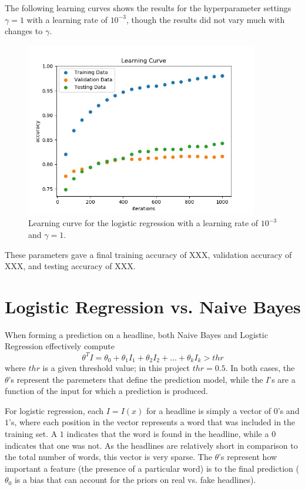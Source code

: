\documentclass{article}
\begin{document}
   The following learning curves shows the results for the hyperparameter settings $\gamma = 1$ with a learning
   rate of $10^{-3}$, though the results did not vary much with changes to $\gamma$.
   \begin{figure}[h] \centering
      \includegraphics[width=4in]{resources/part4}
      \caption{ Learning curve for the logistic regression with a learning rate of $10^{-3}$ and
            $\gamma = 1$.}
   \end{figure}

   These parameters gave a final training accuracy of XXX, validation accuracy of XXX, and testing accuracy of XXX.



   \section{Logistic Regression vs. Naive Bayes}
   When forming a prediction on a headline, both Naive Bayes and Logistic Regression effectively compute
   \begin{equation*}
      \theta^T I = \theta_0 + \theta_1 I_1 + \theta_2 I_2 + ... + \theta_k I_k > thr
   \end{equation*}
   where $thr$ is a given threshold value; in this project $thr = 0.5$. In both cases, the $\theta$'s represent
   the paremeters that define the prediction model, while the $I$'s are a function of the input for which a
   prediction is produced.

   For logistic regression, each $I = I(x)$ for a headline is simply a vector of $0$'s and $1$'s, where each
   position in the vector represents a word that was included in the training set. A $1$ indicates that the
   word is found in the headline, while a $0$ indicates that one was not. As the headlines are relatively short
   in comparison to the total number of words, this vector is very sparse. The $\theta$'s represent how important
   a feature (the presence of a particular word) is to the final prediction ($\theta_0$ is a bias that can
   account for the priors on real vs. fake headlines).
\end{document}
